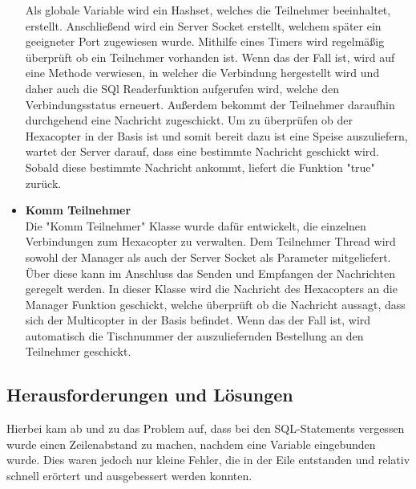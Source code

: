 \begin{itemize}
Als globale Variable wird ein Hashset, welches die Teilnehmer beeinhaltet, erstellt.
Anschließend wird ein Server Socket erstellt, welchem später ein geeigneter Port zugewiesen wurde.
Mithilfe eines Timers wird regelmäßig überprüft ob ein Teilnehmer vorhanden ist. Wenn das der Fall ist, wird auf eine  Methode verwiesen, in welcher die Verbindung hergestellt wird und daher auch die SQl Readerfunktion aufgerufen wird, welche den Verbindungsstatus erneuert. Außerdem bekommt der Teilnehmer daraufhin durchgehend eine Nachricht zugeschickt.
Um zu überprüfen ob der Hexacopter in der Basis ist und somit bereit dazu ist eine Speise auszuliefern, wartet der Server darauf, dass eine bestimmte Nachricht geschickt wird. Sobald diese bestimmte Nachricht ankommt, liefert die Funktion "true" zurück.
    \item \textbf{Komm Teilnehmer}\\
Die "Komm Teilnehmer" Klasse wurde dafür entwickelt, die einzelnen Verbindungen zum Hexacopter zu verwalten.
Dem Teilnehmer Thread wird sowohl der Manager als auch der Server Socket als Parameter mitgeliefert. Über diese kann im Anschluss das Senden und Empfangen der Nachrichten geregelt werden.
In dieser Klasse wird die Nachricht des Hexacopters an die Manager Funktion geschickt, welche überprüft ob die Nachricht aussagt, dass sich der Multicopter in der Basis befindet. Wenn das der Fall ist, wird automatisch die Tischnummer der auszuliefernden Bestellung an den Teilnehmer geschickt.
  \end{itemize}

  \subsection{Herausforderungen und Lösungen}
Hierbei kam ab und zu das Problem auf, dass bei den SQL-Statements vergessen wurde einen Zeilenabstand zu machen, nachdem eine Variable eingebunden wurde. Dies waren jedoch nur kleine Fehler, die in der Eile entstanden und relativ schnell erörtert und ausgebessert werden konnten.
